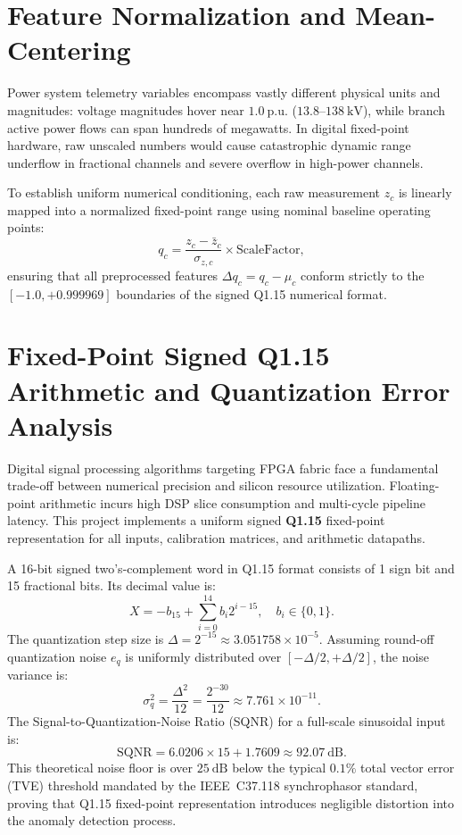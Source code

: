 \documentclass[12pt,a4paper]{report}
\begin{document}
\section{Feature Normalization and Mean-Centering}
Power system telemetry variables encompass vastly different physical units and magnitudes:
voltage magnitudes hover near $1.0~\text{p.u.}$ ($13.8\text{--}138~\text{kV}$), while branch
active power flows can span hundreds of megawatts. In digital fixed-point hardware, raw
unscaled numbers would cause catastrophic dynamic range underflow in fractional channels
and severe overflow in high-power channels.

To establish uniform numerical conditioning, each raw measurement $z_c$ is linearly mapped
into a normalized fixed-point range using nominal baseline operating points:
\begin{equation}
q_c = \frac{z_c - \bar{z}_c}{\sigma_{z,c}} \times \text{ScaleFactor},
\end{equation}
ensuring that all preprocessed features $\Delta q_c = q_c - \mu_c$ conform strictly to the
$[-1.0, +0.999969]$ boundaries of the signed Q1.15 numerical format.

\section{Fixed-Point Signed Q1.15 Arithmetic and Quantization Error Analysis}
Digital signal processing algorithms targeting FPGA fabric face a fundamental trade-off
between numerical precision and silicon resource utilization. Floating-point arithmetic
incurs high DSP slice consumption and multi-cycle pipeline latency. This project implements
a uniform signed \textbf{Q1.15} fixed-point representation for all inputs, calibration
matrices, and arithmetic datapaths.

A 16-bit signed two's-complement word in Q1.15 format consists of 1 sign bit and 15 fractional
bits. Its decimal value is:
\begin{equation}
X = -b_{15} + \sum_{i=0}^{14} b_i 2^{i - 15}, \quad b_i \in \{0, 1\}.
\end{equation}
The quantization step size is $\Delta = 2^{-15} \approx 3.051758 \times 10^{-5}$. Assuming
round-off quantization noise $e_q$ is uniformly distributed over $[-\Delta/2, +\Delta/2]$,
the noise variance is:
\begin{equation}
\sigma_q^2 = \frac{\Delta^2}{12} = \frac{2^{-30}}{12} \approx 7.761 \times 10^{-11}.
\end{equation}
The Signal-to-Quantization-Noise Ratio (SQNR) for a full-scale sinusoidal input is:
\begin{equation}
\text{SQNR} = 6.0206 \times 15 + 1.7609 \approx 92.07~\text{dB}.
\end{equation}
This theoretical noise floor is over $25~\text{dB}$ below the typical $0.1\%$ total vector
error (TVE) threshold mandated by the IEEE~C37.118 synchrophasor standard, proving that Q1.15
fixed-point representation introduces negligible distortion into the anomaly detection process.
\end{document}
